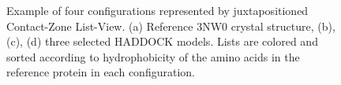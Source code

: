 \documentclass[twocolumn]{bmcart}%
\def\CoZoListView {Contact-Zone List-View\xspace}
\begin{document}
\begin{figure}[tb]
    \vspace{-5pt}
    \caption{Example of four configurations represented by juxtapositioned \CoZoListView. (a) Reference 3NW0 crystal structure, (b), (c), (d) three selected HADDOCK models. Lists are colored and sorted according to hydrophobicity of the amino acids in the reference protein in each configuration.}
  \label{fig:case3}
\end{figure}
\end{document}
